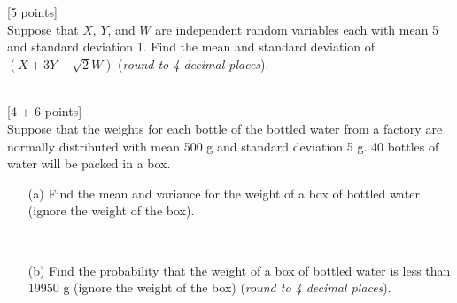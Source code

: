 \documentclass[11pt]{article}
\begin{document}
{\begin{enumerate}
\hfill {}

\vskip 7cm


\end{enumerate}


\hfill[5 points] \\
%
Suppose that $X$, $Y$, and $W$ are independent random variables each
with  mean   5 and standard deviation 1. Find the mean and
standard deviation of $(X + 3Y- \sqrt{2} W)$ (\emph{round to 4 decimal places}).\\

\hfill {}\\

\hfill {}


\newpage

\hfill[4 + 6 points] \\
%
Suppose that the weights for each bottle of the bottled water from a factory are normally distributed with mean 500 g and standard deviation 5 g. 40 bottles of water will be packed in a box.


\begin{itemize}
	\item[(a)] Find the mean and variance for the weight of a box of bottled water (ignore the weight of the box). 

	\hfill {}\\

\hfill {}
\vskip 7cm
\item[(b)] Find the probability that the weight of a box of bottled water is less than 19950 g (ignore the weight of the box) (\emph{round to 4 decimal places}). 


\end{itemize}}
\end{document}
